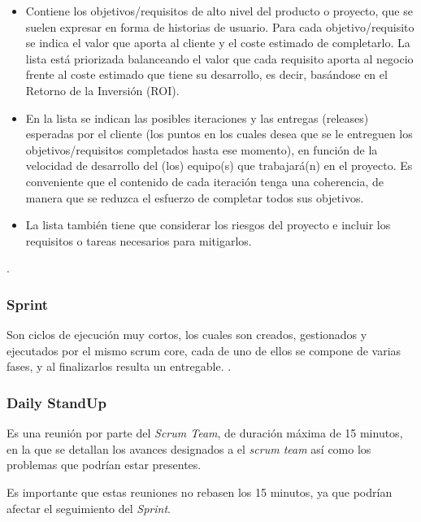 \documentclass[10pt]{article}
\begin{document}
\begin{itemize}
    \item Contiene los objetivos/requisitos de alto nivel del producto o proyecto, que se suelen expresar en forma de historias de usuario. Para cada objetivo/requisito se indica el valor que aporta al cliente y el coste estimado de completarlo. La lista está priorizada balanceando el valor que cada requisito aporta al negocio frente al coste estimado que tiene su desarrollo, es decir, basándose en el Retorno de la Inversión (ROI).
    
    \item En la lista se indican las posibles iteraciones y las entregas (releases) esperadas por el cliente (los puntos en los cuales desea que se le entreguen los objetivos/requisitos completados hasta ese momento), en función de la velocidad de desarrollo del (los) equipo(s) que trabajará(n) en el proyecto. Es conveniente que el contenido de cada iteración tenga una coherencia, de manera que se reduzca el esfuerzo de completar todos sus objetivos.
    \item La lista también tiene que considerar los riesgos del proyecto e incluir los requisitos o tareas necesarios para mitigarlos.

\end{itemize}
\cite{IEEEreferencias:Ref3}.

\subsubsection{Sprint}
Son ciclos de ejecución muy cortos, los cuales son creados, gestionados y ejecutados por el mismo scrum core, cada de uno de ellos se compone de varias fases, y al finalizarlos resulta un entregable. \cite{IEEEreferencias:Ref3}.

\subsubsection{Daily StandUp}
Es una reunión por parte del \textit{Scrum Team}, de duración máxima de 15 minutos, en la que se detallan los avances designados a el \textit{scrum team} así como los problemas que podrían estar presentes.

\setlength{\parskip}{2mm}

Es importante que estas reuniones no rebasen los 15 minutos, ya que podrían afectar el seguimiento del \textit{Sprint}.

\setlength{\parskip}{2mm}
\end{document}
